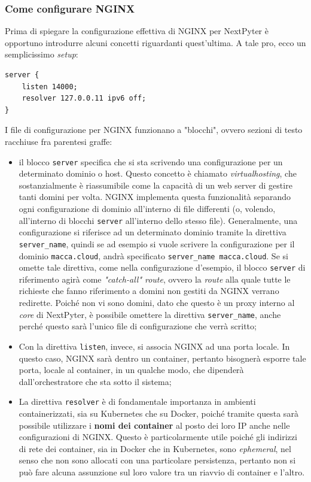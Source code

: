 \subsubsection{Come configurare NGINX}
Prima di spiegare la configurazione effettiva di NGINX per NextPyter è opportuno introdurre alcuni concetti riguardanti quest'ultima.
\newline
A tale pro, ecco un semplicissimo \textit{setup}:
\begin{verbatim}
server {
    listen 14000;
    resolver 127.0.0.11 ipv6 off;
}
\end{verbatim}
I file di configurazione per NGINX funzionano a "blocchi", ovvero sezioni di testo racchiuse fra parentesi graffe:
\begin{itemize}
    \item il blocco \verb|server| specifica che si sta scrivendo una configurazione per un determinato dominio o host. Questo concetto è chiamato \textit{virtualhosting}, che sostanzialmente è riassumibile come la capacità di un web server di gestire tanti domini per volta. NGINX implementa questa funzionalità separando ogni configurazione di dominio all'interno di file differenti (o, volendo, all'interno di blocchi \verb|server| all'interno dello stesso file). Generalmente, una configurazione si riferisce ad un determinato dominio tramite la direttiva \verb|server_name|, quindi se ad esempio si vuole scrivere la configurazione per il dominio \verb|macca.cloud|, andrà specificato \verb|server_name macca.cloud|. Se si omette tale direttiva, come nella configurazione d'esempio, il blocco \verb|server| di riferimento agirà come \textit{"catch-all" route}, ovvero la \textit{route} alla quale tutte le richieste che fanno riferimento a domini non gestiti da NGINX verrano redirette.\newline
    Poiché non vi sono domini, dato che questo è un proxy interno al \textit{core} di NextPyter, è possibile omettere la direttiva \verb|server_name|, anche perché questo sarà l'unico file di configurazione che verrà scritto;
    \item Con la direttiva \verb|listen|, invece, si associa NGINX ad una porta locale. In questo caso, NGINX sarà dentro un container, pertanto bisognerà esporre tale porta, locale al container, in un qualche modo, che dipenderà dall'orchestratore che sta sotto il sistema;
    \item La direttiva \verb|resolver| è di fondamentale importanza in ambienti containerizzati, sia su Kubernetes che su Docker, poiché tramite questa sarà possibile utilizzare i \textbf{nomi dei container} al posto dei loro IP anche nelle configurazioni di NGINX. Questo è particolarmente utile poiché gli indirizzi di rete dei container, sia in Docker che in Kubernetes, sono \textit{ephemeral}, nel senso che non sono allocati con una particolare persistenza, pertanto non si può fare alcuna assunzione sul loro valore tra un riavvio di container e l'altro.
\end{itemize}
